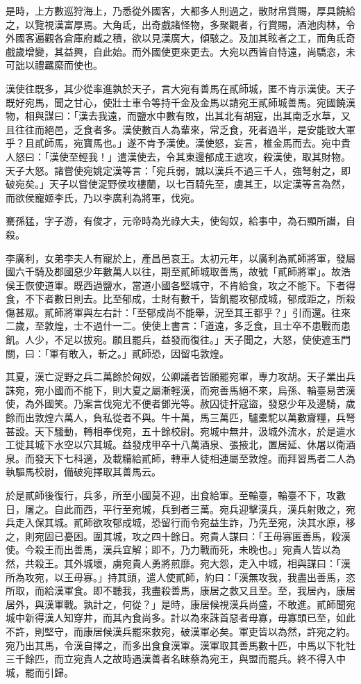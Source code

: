 \begin{pinyinscope}
是時，上方數巡狩海上，乃悉從外國客，大都多人則過之，散財帛賞賜，厚具饒給之，以覽視漢富厚焉。大角氐，出奇戲諸怪物，多聚觀者，行賞賜，酒池肉林，令外國客遍觀各倉庫府臧之積，欲以見漢廣大，傾駭之。及加其眩者之工，而角氐奇戲歲增變，其益興，自此始。而外國使更來更去。大宛以西皆自恃遠，尚驕恣，未可詘以禮羈縻而使也。

漢使往既多，其少從率進孰於天子，言大宛有善馬在貳師城，匿不肯示漢使。天子既好宛馬，聞之甘心，使壯士車令等持千金及金馬以請宛王貳師城善馬。宛國饒漢物，相與謀曰：「漢去我遠，而鹽水中數有敗，出其北有胡寇，出其南乏水草，又且往往而絕邑，乏食者多。漢使數百人為輩來，常乏食，死者過半，是安能致大軍乎？且貳師馬，宛寶馬也。」遂不肯予漢使。漢使怒，妄言，椎金馬而去。宛中貴人怒曰：「漢使至輕我！」遣漢使去，令其東邊郁成王遮攻，殺漢使，取其財物。天子大怒。諸嘗使宛姚定漢等言：「宛兵弱，誠以漢兵不過三千人，強弩射之，即破宛矣。」天子以嘗使浞野侯攻樓蘭，以七百騎先至，虜其王，以定漢等言為然，而欲侯寵姬李氏，乃以李廣利為將軍，伐宛。

騫孫猛，字子游，有俊才，元帝時為光祿大夫，使匈奴，給事中，為石顯所譖，自殺。

李廣利，女弟李夫人有寵於上，產昌邑哀王。太初元年，以廣利為貳師將軍，發屬國六千騎及郡國惡少年數萬人以往，期至貳師城取善馬，故號「貳師將軍」。故浩侯王恢使道軍。既西過鹽水，當道小國各堅城守，不肯給食，攻之不能下。下者得食，不下者數日則去。比至郁成，士財有數千，皆飢罷攻郁成城，郁成距之，所殺傷甚眾。貳師將軍與左右計：「至郁成尚不能舉，況至其王都乎？」引而還。往來二歲，至敦煌，士不過什一二。使使上書言：「道遠，多乏食，且士卒不患戰而患飢。人少，不足以拔宛。願且罷兵，益發而復往。」天子聞之，大怒，使使遮玉門關，曰：「軍有敢入，斬之。」貳師恐，因留屯敦煌。

其夏，漢亡浞野之兵二萬餘於匈奴，公卿議者皆願罷宛軍，專力攻胡。天子業出兵誅宛，宛小國而不能下，則大夏之屬漸輕漢，而宛善馬絕不來，烏孫、輪臺易苦漢使，為外國笑。乃案言伐宛尤不便者鄧光等。赦囚徒扞寇盜，發惡少年及邊騎，歲餘而出敦煌六萬人，負私從者不與。牛十萬，馬三萬匹，驢橐駝以萬數齎糧，兵弩甚設。天下騷動，轉相奉伐宛，五十餘校尉。宛城中無井，汲城外流水，於是遣水工徙其城下水空以穴其城。益發戍甲卒十八萬酒泉、張掖北，置居延、休屠以衛酒泉。而發天下七科適，及載糒給貳師，轉車人徒相連屬至敦煌。而拜習馬者二人為執驅馬校尉，備破宛擇取其善馬云。

於是貳師後復行，兵多，所至小國莫不迎，出食給軍。至輪臺，輪臺不下，攻數日，屠之。自此而西，平行至宛城，兵到者三萬。宛兵迎擊漢兵，漢兵射敗之，宛兵走入保其城。貳師欲攻郁成城，恐留行而令宛益生詐，乃先至宛，決其水原，移之，則宛固已憂困。圍其城，攻之四十餘日。宛貴人謀曰：「王毋寡匿善馬，殺漢使。今殺王而出善馬，漢兵宜解；即不，乃力戰而死，未晚也。」宛貴人皆以為然，共殺王。其外城壞，虜宛貴人勇將煎靡。宛大怨，走入中城，相與謀曰：「漢所為攻宛，以王毋寡。」持其頭，遣人使貳師，約曰：「漢無攻我，我盡出善馬，恣所取，而給漢軍食。即不聽我，我盡殺善馬，康居之救又且至。至，我居內，康居居外，與漢軍戰。孰計之，何從？」是時，康居候視漢兵尚盛，不敢進。貳師聞宛城中新得漢人知穿井，而其內食尚多。計以為來誅首惡者毋寡，毋寡頭已至，如此不許，則堅守，而康居候漢兵罷來救宛，破漢軍必矣。軍吏皆以為然，許宛之約。宛乃出其馬，令漢自擇之，而多出食食漢軍。漢軍取其善馬數十匹，中馬以下牝牡三千餘匹，而立宛貴人之故時遇漢善者名昧蔡為宛王，與盟而罷兵。終不得入中城，罷而引歸。


\end{pinyinscope}
